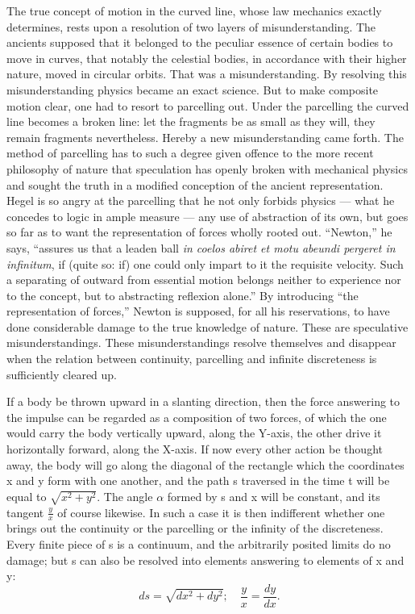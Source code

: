 \documentclass[12pt,a4paper]{book}
\begin{document}
The true concept of motion in the curved line, whose law mechanics exactly
determines, rests upon a resolution of two layers of misunderstanding. The ancients
supposed that it belonged to the peculiar essence of certain bodies to move in
curves, that notably the celestial bodies, in accordance with their higher nature,
moved in circular orbits. That was a misunderstanding. By resolving this
misunderstanding physics became an exact science. But to make composite motion clear,
one had to resort to parcelling out. Under the parcelling the curved line becomes a
broken line: let the fragments be as small as they will, they remain
fragments nevertheless. Hereby a new misunderstanding came forth. The method of
parcelling has to such a degree given offence to the more recent philosophy of
nature that speculation has openly broken with mechanical physics and sought the
truth in a modified conception of the ancient representation. Hegel is so angry at
the parcelling that he not only forbids physics --- what he concedes to logic in
ample measure --- any use of abstraction of its own, but goes so far as to want the
representation of forces wholly rooted out. ``Newton,'' he says, ``assures us that a
leaden ball \textit{in coelos abiret et motu abeundi pergeret in infinitum}, if
(quite so: if) one could only impart to it the requisite velocity. Such a separating
of outward from essential motion belongs neither to experience nor to the concept,
but to abstracting reflexion alone.'' By introducing ``the representation of
forces,'' Newton is supposed, for all his reservations, to have done considerable
damage to the true knowledge of nature. These are speculative misunderstandings.
These misunderstandings resolve themselves and disappear when the relation between
continuity, parcelling and infinite discreteness is sufficiently cleared up.

If a body be thrown upward in a slanting direction, then the force answering to the
impulse can be regarded as a composition of two forces, of which the one would carry
the body vertically upward, along the Y-axis, the other drive it horizontally
forward, along the X-axis. If now every other action be thought away, the body will
go along the diagonal of the rectangle which the coordinates x and y form with one
another, and the path s traversed in the time t will be equal to $\sqrt{x^2 + y^2}$.
The angle $\alpha$ formed by s and x will be constant, and its tangent
$\frac{y}{x}$ of course likewise. In such a case it is then indifferent whether one
brings out the continuity or the parcelling or the infinity of the
discreteness. Every finite piece of s is a continuum, and the arbitrarily posited
limits do no damage; but s can also be resolved into elements answering to elements
of x and y:
\[
ds = \sqrt{dx^2 + dy^2};\quad \frac{y}{x} = \frac{dy}{dx}.
\]
\end{document}
